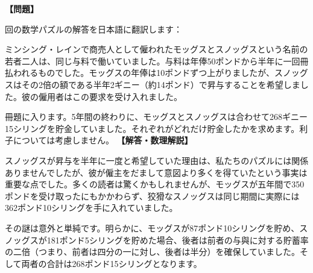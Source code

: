 \documentclass[10pt,a4paper,oneside,openany]{ltjsbook}
\begin{document}
\begin{tcolorbox}[colback=softblue,colframe=primaryblue,title=\textbf{第 26 問：THE JUNIOR CLERK'S PUZZLE.},arc=2mm,boxrule=1pt,breakable]
\textbf{【問題】}\par\vspace{0.3em}
回の数学パズルの解答を日本語に翻訳します：

ミンシング・レインで商売人として僱われたモッグスとスノッグスという名前の若者二人は、同じ与料で働いていました。与料は年俸50ポンドから半年に一回冊払われるものでした。モッグスの年俸は10ポンドずつ上がりましたが、スノッグスはその2倍の額である半年2ギニー（約14ポンド）で昇与することを希望しました。彼の僱用者はこの要求を受け入れました。

冊題に入ります。5年間の終わりに、モッグスとスノッグスは合わせて268ギニー15シリングを貯金していました。それぞれがどれだけ貯金したかを求めます。利子については考慮しません。
\tcblower
\textbf{【解答・数理解説】}\par\vspace{0.3em}
スノッグスが昇与を半年に一度と希望していた理由は、私たちのパズルには関係ありませんでしたが、彼が僱主をだまして意図より多くを得ていたという事実は重要な点でした。多くの読者は驚くかもしれませんが、モッグスが五年間で350ポンドを受け取ったにもかかわらず、狡猾なスノッグスは同じ期間に実際には362ポンド10シリングを手に入れていました。

その謎は意外と単純です。明らかに、モッグスが87ポンド10シリングを貯め、スノッグスが181ポンド5シリングを貯めた場合、後者は前者の与與に対する貯蓄率の二倍（つまり、前者は四分の一に対し、後者は半分）を確保していました。そして両者の合計は268ポンド15シリングとなります。
\end{tcolorbox}
\end{document}
